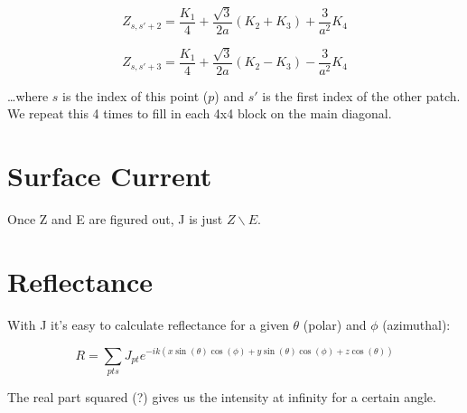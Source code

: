 \documentclass[etd,oneside,senior]{BYUPhys}
\begin{document}
\begin{equation}
  Z_{s,s'+2}=\frac{K_{1}}{4}+\frac{\sqrt{3}}{2a}\left(K_{2}+K_{3}\right)+\frac{3}{a^{2}}K_{4}
\end{equation}

\begin{equation}
  Z_{s,s'+3}=\frac{K_{1}}{4}+\frac{\sqrt{3}}{2a}\left(K_{2}-K_{3}\right)-\frac{3}{a^{2}}K_{4}
\end{equation}

\ldots where $s$ is the index of this point ($p$) and $s'$ is the first
index of the other patch. We repeat this 4 times to fill in each 4x4
block on the main diagonal.







\section{Surface Current} \label{sec:current}

Once Z and E are figured out, J is just $Z\backslash E$.



\section{Reflectance} \label{sec:reflectance}

With J it's easy to calculate reflectance for a given $\theta$ (polar) and $\phi$ (azimuthal):

\begin{equation}
  R=\sum_{pts}J_{pt}e^{-ik\left(x\sin\left(\theta\right)\cos\left(\phi\right)+y\sin\left(\theta\right)\cos\left(\phi\right)+z\cos\left(\theta\right)\right)}
\end{equation}

The real part squared (?) gives us the intensity at infinity for a certain angle.






\end{document}
